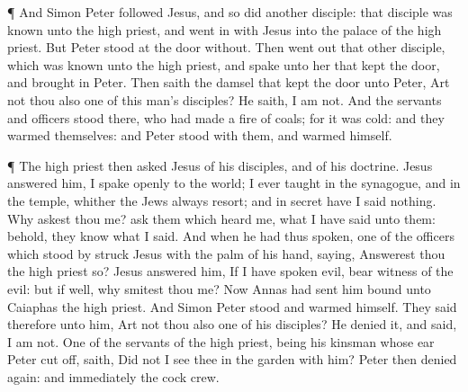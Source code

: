  ¶ And Simon Peter followed Jesus, and so did another
disciple: that disciple was known unto the high priest, and went in with
Jesus into the palace of the high priest.  But Peter stood
at the door without. Then went out that other disciple, which was known
unto the high priest, and spake unto her that kept the door, and brought
in Peter.  Then saith the damsel that kept the door unto
Peter, Art not thou also one of this man's disciples? He saith, I am
not.  And the servants and officers stood there, who had
made a fire of coals; for it was cold: and they warmed themselves: and
Peter stood with them, and warmed himself.

 ¶ The high priest then asked Jesus of his disciples, and
of his doctrine.  Jesus answered him, I spake openly to the
world; I ever taught in the synagogue, and in the temple, whither the
Jews always resort; and in secret have I said nothing.  Why
askest thou me? ask them which heard me, what I have said unto them:
behold, they know what I said.  And when he had thus
spoken, one of the officers which stood by struck Jesus with the palm of
his hand, saying, Answerest thou the high priest so?  Jesus
answered him, If I have spoken evil, bear witness of the evil: but if
well, why smitest thou me?  Now Annas had sent him bound
unto Caiaphas the high priest.  And Simon Peter stood and
warmed himself. They said therefore unto him, Art not thou also one of
his disciples? He denied it, and said, I am not.  One of
the servants of the high priest, being his kinsman whose ear Peter cut
off, saith, Did not I see thee in the garden with him? 
Peter then denied again: and immediately the cock crew.

